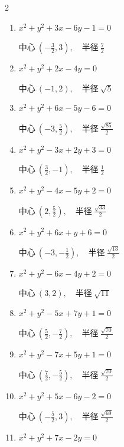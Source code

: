 \begin{multicols}{2}
\begin{enumerate}
  \item $x^{2}+y^{2}+3x-6y-1=0$

        $\displaystyle 中心\: \left(-\frac{3}{2},3\right), \quad 半径 \ \frac{7}{2}$

  \item $x^{2}+y^{2}+2x-4y=0$

        $\displaystyle 中心\: \left(-1,2\right), \quad 半径 \ \sqrt{5}$

  \item $x^{2}+y^{2}+6x-5y-6=0$

        $\displaystyle 中心\: \left(-3,\frac{5}{2}\right), \quad 半径 \ \frac{\sqrt{85}}{2}$

  \item $x^{2}+y^{2}-3x+2y+3=0$

        $\displaystyle 中心\: \left(\frac{3}{2},-1\right), \quad 半径 \ \frac{1}{2}$

\columnbreak %

\resetques

  \item $x^{2}+y^{2}-4x-5y+2=0$

        $\displaystyle 中心\: \left(2,\frac{5}{2}\right), \quad 半径 \ \frac{\sqrt{33}}{2}$

  \item $x^{2}+y^{2}+6x+y+6=0$

        $\displaystyle 中心\: \left(-3,-\frac{1}{2}\right), \quad 半径 \ \frac{\sqrt{13}}{2}$

  \item $x^{2}+y^{2}-6x-4y+2=0$

        $\displaystyle 中心\: \left(3,2\right), \quad 半径 \ \sqrt{11}$

  \item $x^{2}+y^{2}-5x+7y+1=0$

        $\displaystyle 中心\: \left(\frac{5}{2},-\frac{7}{2}\right), \quad 半径 \ \frac{\sqrt{70}}{2}$

  \item $x^{2}+y^{2}-7x+5y+1=0$

        $\displaystyle 中心\: \left(\frac{7}{2},-\frac{5}{2}\right), \quad 半径 \ \frac{\sqrt{70}}{2}$

  \item $x^{2}+y^{2}+5x-6y-2=0$

        $\displaystyle 中心\: \left(-\frac{5}{2},3\right), \quad 半径 \ \frac{\sqrt{69}}{2}$

  \item $x^{2}+y^{2}+7x-2y=0$


\end{enumerate}
\end{multicols}
